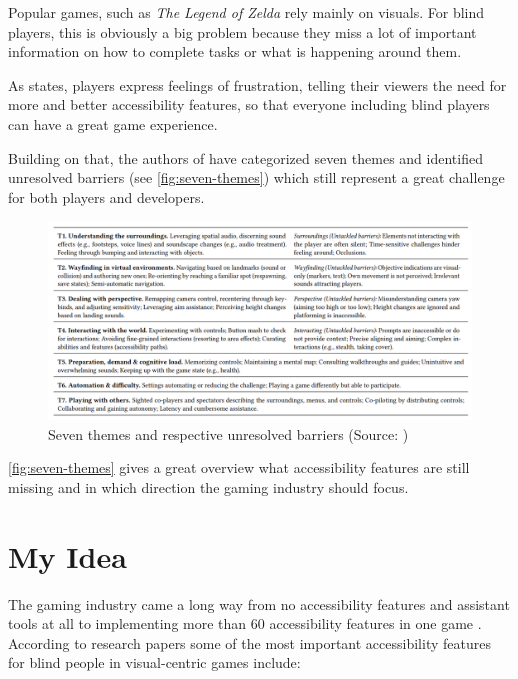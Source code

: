 \documentclass[sigconf,natbib=false,10pt]{acmart}
\begin{document}
	Popular games, such as \emph{The Legend of Zelda} rely mainly on visuals.
	For blind players, this is obviously a big problem because they miss a lot of important information on how to complete tasks or what is happening around them.
	
	As \textcite{goncalves_my_2023} states, players express feelings of frustration, telling their viewers the need for more and better accessibility features, so that everyone including blind players can have a great game experience.
	
	Building on that, the authors of \textcite{goncalves_my_2023} have categorized seven themes and identified unresolved barriers (see \autoref{fig:seven-themes}) which still represent a great challenge for both players and developers.
	
	\begin{figure}[ht]
		\centering
		\includegraphics[scale=0.6,width=\textwidth]{assets/seven-themes.png}
		\caption{Seven themes and respective unresolved barriers (Source: \textcite{goncalves_my_2023})}
		\label{fig:seven-themes}
	\end{figure}

	\autoref{fig:seven-themes} gives a great overview what accessibility features are still missing and in which direction the gaming industry should focus.
	
	\section{My Idea} \label{sec:myIdea}
	The gaming industry came a long way from no accessibility features and assistant tools at all to implementing more than 60 accessibility features in one game \cite{playstation_last_2020}.
	According to research papers \cite{goncalves_my_2023, grammenos_designing_2009, grammenos_game_2008, araujo_mobile_2017} some of the most important accessibility features for blind people in visual-centric games include:
	
\end{document}
